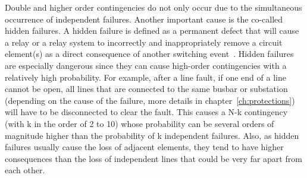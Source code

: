 

Double and higher order contingencies do not only occur due to the simultaneous occurrence of independent failures. Another important cause is the co-called hidden failures. A hidden failure is defined as a permanent defect that will cause a relay or a relay system to incorrectly and inappropriately remove a circuit element(s) as a direct consequence of another switching event~\cite{ZoneVulnerability}. Hidden failures are especially dangerous since they can cause high-order contingencies with a relatively high probability. For example, after a line fault, if one end of a line cannot be open, all lines that are connected to the same busbar or substation (depending on the cause of the failure, more details in chapter~\ref{ch:protections}) will have to be disconnected to clear the fault. This causes a N-k contingency (with k in the order of 2 to 10) whose probability can be several orders of magnitude higher than the probability of k independent failures. Also, as hidden failures usually cause the loss of adjacent elements, they tend to have higher consequences than the loss of independent lines that could be very far apart from each other.



